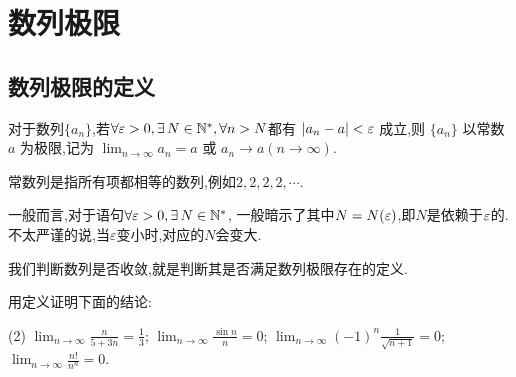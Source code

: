 \setcounter{chapter}{1}
\chapter{数列极限}

\section{数列极限的定义}

\begin{definition}[数列极限]\label{def:sequence_limit}
    对于数列$\{a_n\}$,若$\forall \ve >0, \exists N\in \mathbb{N}^*, \forall n>N $都有 $|a_n-a|<\varepsilon$ 成立,则 $\{a_n\}$ 以常数 $a$ 为极限,记为 $\lim_{n \to \infty} a_n=a$ 或 $a_n\rightarrow a (n\rightarrow \infty)$.
\end{definition}

常数列是指所有项都相等的数列,例如$2,2,2,2,\cdots$.

\begin{remark}
    一般而言,对于语句$\forall \ve >0, \exists N \in \mathbb{N}^*$, 一般暗示了其中$N = N(\varepsilon)$,即$N$是依赖于$\varepsilon$的. 不太严谨的说,当$\varepsilon$变小时,对应的$N$会变大.
\end{remark}

我们判断数列是否收敛,就是判断其是否满足数列极限存在的定义.
\begin{exercise}[1.2.1]
    用定义证明下面的结论:
    \begin{tasks}[label=(\arabic*)](2)
        \task $\lim_{n\to\infty} \frac{n}{5+3n} = \frac{1}{3}$;
        \task $\lim_{n\to\infty} \frac{\sin n}{n} = 0$;
        \task $\lim_{n\to\infty} (-1)^n \frac{1}{\sqrt{n+1}} = 0$;
        \task $\lim_{n\to\infty} \frac{n!}{n^n} = 0$.
    \end{tasks}
\end{exercise}


